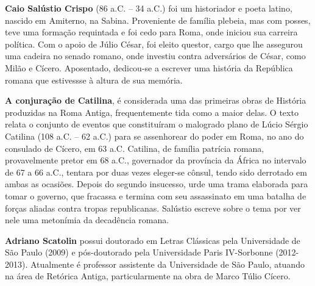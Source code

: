 \textbf{Caio Salústio Crispo} (86 a.C. -- 34 a.C.) foi um historiador e poeta latino, nascido em Amiterno, na Sabina. Proveniente de família plebeia, mas com posses, teve uma formação requintada e foi cedo para Roma, onde iniciou sua carreira política. Com o apoio de Júlio César, foi eleito questor, cargo que lhe assegurou uma cadeira no senado romano, onde investiu contra adversários de César, como Milão e Cícero. Aposentado, dedicou-se a escrever uma história da República romana que estivessse à altura de sua memória.


\textbf{A conjuração de Catilina}, é considerada uma das primeiras obras de História produzidas na Roma Antiga, frequentemente tida como a maior delas. O texto relata o conjunto de eventos que constituíram o malogrado plano de Lúcio Sérgio Catilina (108 a.C. -- 62 a.C.) para se assenhorear do poder em Roma, no ano do consulado de Cícero, em 63 a.C. Catilina, de família patrícia romana, provavelmente pretor em 68 a.C., governador da província da África no intervalo de 67 a 66 a.C., tentara por duas vezes eleger-se cônsul, tendo sido derrotado em ambas as ocasiões. Depois do segundo insucesso, urde uma trama elaborada para tomar o governo, que fracassa e termina com seu assassinato em uma batalha de forças aliadas contra tropas republicanas. Salústio escreve sobre o tema por ver nele uma metonímia da decadência romana.


\textbf{Adriano Scatolin} possui doutorado em Letras Clássicas pela Universidade de São Paulo (2009) e pós-doutorado pela Universidade Paris IV-Sorbonne (2012-2013). Atualmente é professor assistente da Universidade de São Paulo, atuando na área de Retórica Antiga, particularmente na obra de Marco Túlio Cícero.\par
